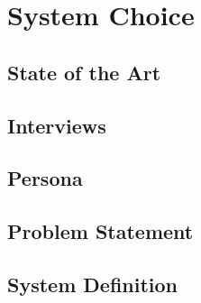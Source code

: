 \chapter{System Choice}


\section{State of the Art}
\label{StateOfTheArt}


\section{Interviews}





\section{Persona}


\section{Problem Statement}
\label{ProblemStatement}


\section{System Definition}

